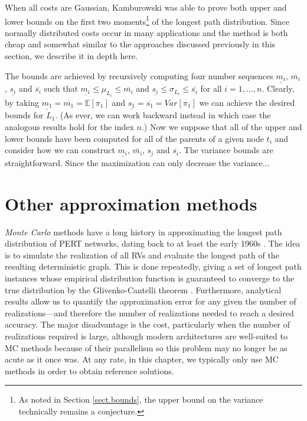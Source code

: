 \documentclass[12pt]{article}
\def\E{\mathbb{E}}
\begin{document}
When all costs are Gaussian, Kamburowski was able to prove both upper and lower bounds on the first two moments\footnote{As noted in Section \ref{sect.bounds}, the upper bound on the variance technically remains a conjecture.} of the longest path distribution. Since normally distributed costs occur in many applications and the method is both cheap and somewhat similar to the approaches discussed previously in this section, we describe it in depth here.

The bounds are achieved by recursively computing four number sequences $\underline{m_i}$, $\overline{m_i}$, $\underline{s_i}$ and  $\overline{s_i}$ such that $\underline{m_i} \leq \mu_{L_i} \leq \overline{m_i}$ and $ \underline{s_i} \leq \sigma_{L_i} \leq \overline{s_i}$ for all $i = 1, \dots, n$. Clearly, by taking $\underline{m_1} = \overline{m_1} = \E[\pi_1]$ and $\underline{s_1} = \overline{s_1} = Var[\pi_1]$ we can achieve the desired bounds for $L_1$. (As ever, we can work backward instead in which case the analogous results hold for the index $n$.) Now we suppose that all of the upper and lower bounds have been computed for all of the parents of a given node $t_i$ and consider how we can construct  $\underline{m_i}$, $\overline{m_i}$, $\underline{s_i}$ and  $\overline{s_i}$. The variance bounds are straightforward. Since the maximization can only decrease the variance...


\section{Other approximation methods}
\label{sect.other_methods} 


{\em Monte Carlo} methods have a long history in approximating the longest path distribution of PERT networks, dating back to at least the early 1960s \cite{van63}. The idea is to simulate the realization of all RVs and evaluate the longest path of the resulting deterministic graph. This is done repeatedly, giving a set of longest path instances whose empirical distribution function is guaranteed to converge to the true distribution by the Glivenko-Cantelli theorem \cite{can16}. Furthermore, analytical results allow us to quantify the approximation error for any given the number of realizations---and therefore the number of realizations needed to reach a desired accuracy. The major disadvantage is the cost, particularly when the number of realizations required is large, although modern architectures are well-suited to MC methods because of their parallelism so this problem may no longer be as acute as it once was. At any rate, in this chapter, we typically only use MC methods in order to obtain reference solutions.
\end{document}
